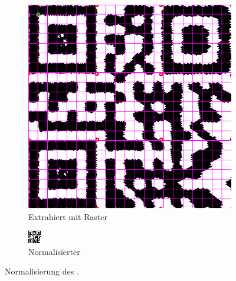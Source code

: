 \begin{figure}[h]
\centering
\begin{subfigure}[t]{0.45\textwidth}
\centering
\includegraphics[scale=0.25]{images/gitter.png}
\caption{Extrahiert mit Raster}
\label{fig:version-qrcode}
\end{subfigure}
\begin{subfigure}[t]{0.45\textwidth}
\centering
\includegraphics[scale=5.5]{images/qrcode-adler.png}
\caption{Normalisierter \QRCode}
\label{fig:final}
\end{subfigure}
\caption{Normalisierung des \QRCodes.}
\end{figure}

